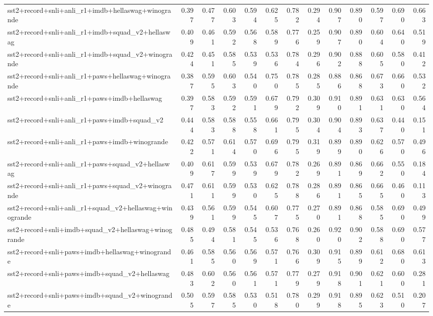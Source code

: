 \begin{table}[t]
\begin{tabular}{lrrrrrrrrrrrr}
    sst2+record+snli+anli\_r1+imdb+hellaswag+winogrande & 0.397 & 0.477 & 0.603 & 0.594 & 0.625 & 0.782 & 0.294 & 0.907 & 0.890 & 0.597 & 0.690 & 0.663 \\
    sst2+record+snli+anli\_r1+imdb+squad\_v2+hellaswag & 0.409 & 0.461 & 0.592 & 0.568 & 0.589 & 0.776 & 0.259 & 0.907 & 0.890 & 0.604 & 0.640 & 0.519 \\
    sst2+record+snli+anli\_r1+imdb+squad\_v2+winogrande & 0.424 & 0.451 & 0.585 & 0.539 & 0.536 & 0.784 & 0.296 & 0.902 & 0.888 & 0.605 & 0.580 & 0.412 \\
    sst2+record+snli+anli\_r1+paws+hellaswag+winogrande & 0.387 & 0.595 & 0.603 & 0.540 & 0.750 & 0.785 & 0.285 & 0.886 & 0.868 & 0.673 & 0.660 & 0.532 \\
    sst2+record+snli+anli\_r1+paws+imdb+hellaswag & 0.397 & 0.583 & 0.592 & 0.591 & 0.679 & 0.792 & 0.309 & 0.910 & 0.891 & 0.631 & 0.630 & 0.564 \\
    sst2+record+snli+anli\_r1+paws+imdb+squad\_v2 & 0.444 & 0.583 & 0.588 & 0.558 & 0.661 & 0.795 & 0.304 & 0.904 & 0.893 & 0.637 & 0.440 & 0.151 \\
    sst2+record+snli+anli\_r1+paws+imdb+winogrande & 0.422 & 0.571 & 0.614 & 0.570 & 0.696 & 0.795 & 0.319 & 0.899 & 0.890 & 0.626 & 0.570 & 0.496 \\
    sst2+record+snli+anli\_r1+paws+squad\_v2+hellaswag & 0.409 & 0.617 & 0.599 & 0.539 & 0.679 & 0.782 & 0.269 & 0.891 & 0.869 & 0.662 & 0.550 & 0.184 \\
    sst2+record+snli+anli\_r1+paws+squad\_v2+winogrande & 0.471 & 0.611 & 0.599 & 0.530 & 0.625 & 0.788 & 0.286 & 0.891 & 0.865 & 0.665 & 0.460 & 0.113 \\
    sst2+record+snli+anli\_r1+squad\_v2+hellaswag+winogrande & 0.439 & 0.561 & 0.599 & 0.545 & 0.607 & 0.775 & 0.270 & 0.891 & 0.868 & 0.585 & 0.690 & 0.499 \\
    sst2+record+snli+imdb+squad\_v2+hellaswag+winogrande & 0.485 & 0.494 & 0.581 & 0.545 & 0.536 & 0.768 & 0.260 & 0.920 & 0.902 & 0.588 & 0.690 & 0.577 \\
    sst2+record+snli+paws+imdb+hellaswag+winogrande & 0.461 & 0.585 & 0.560 & 0.569 & 0.571 & 0.766 & 0.309 & 0.915 & 0.899 & 0.612 & 0.680 & 0.613 \\
    sst2+record+snli+paws+imdb+squad\_v2+hellaswag & 0.483 & 0.602 & 0.560 & 0.561 & 0.571 & 0.779 & 0.279 & 0.918 & 0.901 & 0.621 & 0.600 & 0.281 \\
    sst2+record+snli+paws+imdb+squad\_v2+winogrande & 0.505 & 0.597 & 0.585 & 0.530 & 0.518 & 0.780 & 0.299 & 0.918 & 0.895 & 0.623 & 0.510 & 0.207 \\

\end{tabular}
\end{table}
